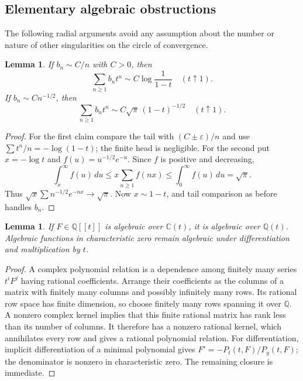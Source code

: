 \documentclass[11pt,letterpaper]{article}
\numberwithin{equation}{section}
\newtheorem{lemma}[theorem]{Lemma}
\theoremstyle{definition}
\newcommand{\Q}{\mathbb Q}
\newcommand{\1}{\mathbf 1}
\newcommand{\C}{\mathbb C}
\begin{document}
\subsection{Elementary algebraic obstructions}
The following radial arguments avoid any assumption about the number or nature of other singularities on the circle of convergence.

\begin{lemma}\label{shr:sd:lem:abel}
If $b_n\sim C/n$ with $C>0$, then
\[
 \sum_{n\ge1}b_nt^n\sim C\log\frac1{1-t}\quad(t\uparrow1).
\]
If $b_n\sim Cn^{-1/2}$, then
\[
 \sum_{n\ge1}b_nt^n\sim C\sqrt\pi\,(1-t)^{-1/2}\quad(t\uparrow1).
\]
\end{lemma}
\begin{proof}
For the first claim compare the tail with $(C\pm\varepsilon)/n$ and use $\sum t^n/n=-\log(1-t)$; the finite head is negligible. For the second put $x=-\log t$ and $f(u)=u^{-1/2}e^{-u}$. Since $f$ is positive and decreasing,
\[
 \int_x^\infty f(u)\,du
 \le x\sum_{n\ge1}f(nx)
 \le\int_0^\infty f(u)\,du=\sqrt\pi.
\]
Thus $\sqrt x\sum n^{-1/2}e^{-nx}\to\sqrt\pi$. Now $x\sim1-t$, and tail comparison as before handles $b_n$.
\end{proof}

\begin{lemma}\label{shr:sd:lem:descent}
If $F\in\Q[[t]]$ is algebraic over $\C(t)$, it is algebraic over $\Q(t)$. Algebraic functions in characteristic zero remain algebraic under differentiation and multiplication by $t$.
\end{lemma}
\begin{proof}
A complex polynomial relation is a dependence among finitely many series $t^iF^j$ having rational coefficients. Arrange their coefficients as the columns of a matrix with finitely many columns and possibly infinitely many rows. Its rational row space has finite dimension, so choose finitely many rows spanning it over $\Q$. A nonzero complex kernel implies that this finite rational matrix has rank less than its number of columns. It therefore has a nonzero rational kernel, which annihilates every row and gives a rational polynomial relation. For differentiation, implicit differentiation of a minimal polynomial gives $F'=-P_t(t,F)/P_y(t,F)$; the denominator is nonzero in characteristic zero. The remaining closure is immediate.
\end{proof}
\end{document}
